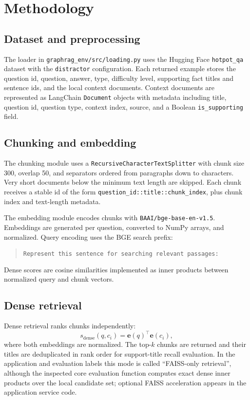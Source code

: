 \documentclass{article}
\begin{document}
\section{Methodology}

\subsection{Dataset and preprocessing}

The loader in \texttt{graphrag\_env/src/loading.py} uses the Hugging Face \texttt{hotpot\_qa} dataset with the \texttt{distractor} configuration. Each returned example stores the question id, question, answer, type, difficulty level, supporting fact titles and sentence ids, and the local context documents. Context documents are represented as LangChain \texttt{Document} objects with metadata including title, question id, question type, context index, source, and a Boolean \texttt{is\_supporting} field.

\subsection{Chunking and embedding}

The chunking module uses a \texttt{RecursiveCharacterTextSplitter} with chunk size 300, overlap 50, and separators ordered from paragraphs down to characters. Very short documents below the minimum text length are skipped. Each chunk receives a stable id of the form \texttt{question\_id::title::chunk\_index}, plus chunk index and text-length metadata.

The embedding module encodes chunks with \texttt{BAAI/bge-base-en-v1.5}. Embeddings are generated per question, converted to NumPy arrays, and normalized. Query encoding uses the BGE search prefix:
\begin{quote}
\small \texttt{Represent this sentence for searching relevant passages:}
\end{quote}
Dense scores are cosine similarities implemented as inner products between normalized query and chunk vectors.

\subsection{Dense retrieval}

Dense retrieval ranks chunks independently:
\begin{equation}
s_{\mathrm{dense}}(q,c_i) = \mathbf{e}(q)^\top \mathbf{e}(c_i),
\end{equation}
where both embeddings are normalized. The top-$k$ chunks are returned and their titles are deduplicated in rank order for support-title recall evaluation. In the application and evaluation labels this mode is called ``FAISS-only retrieval'', although the inspected core evaluation function computes exact dense inner products over the local candidate set; optional FAISS acceleration appears in the application service code.
\end{document}
